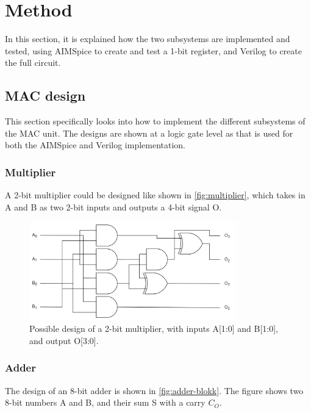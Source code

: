 \section{Method}
\label{sec:method}

In this section, it is explained how the two subsystems are implemented and tested, using AIMSpice to create and test a 1-bit register, and Verilog to create the full circuit. 

\subsection{MAC design}
\label{subsec:circuitDesign}

This section specifically looks into how to implement the different subsystems of the MAC unit. The designs are shown at a logic gate level as that is used for both the AIMSpice and Verilog implementation. 

\subsubsection{Multiplier} 

A 2-bit multiplier could be designed like shown in \autoref{fig:multiplier}, which takes in A and B as two 2-bit inputs and outputs a 4-bit signal O. 

\begin{figure}[H]
    \centering
    \includegraphics[width=0.8\textwidth]{Figures/multiplier.png}
    \caption{Possible design of a 2-bit multiplier, with inputs A[1:0] and B[1:0], and output O[3:0].}
    \label{fig:multiplier}
\end{figure}

\subsubsection{Adder}

The design of an 8-bit adder is shown in \autoref{fig:adder-blokk}. The figure shows two 8-bit numbers A and B, and their sum S with a carry $C_O$. 

